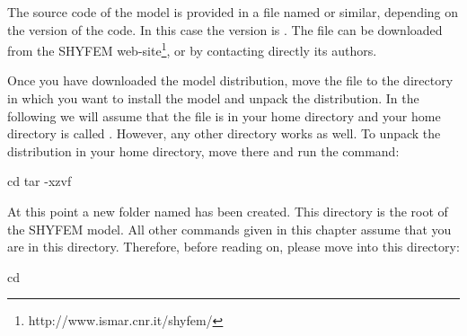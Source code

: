 
The source code of the model is provided in a file named \ttt{\shydist}
or similar, depending on the version of the code. In this case the
version is \version.  The file can be downloaded from the SHYFEM
web-site\footnote{http://www.ismar.cnr.it/shyfem/}, or by contacting
directly its authors.

Once you have downloaded the model distribution, move the file to
the directory in which you want to install the model and unpack the
distribution. In the following we will assume that the file is in your
home directory and your home directory is called \ttt{\basedir}. However,
any other directory works as well. To unpack the distribution
in your home directory, move there and run the command:

\begin{codem}
    cd \basedir
    tar -xzvf \shydist
\end{codem}

At this point a new folder named \ttt{\shydir} has been created. 
This directory is the root of the SHYFEM model. All other commands
given in this chapter assume that you are in this directory. 
Therefore, before reading on, please move into this directory:

\begin{codem}
    cd \shydir
\end{codem}




